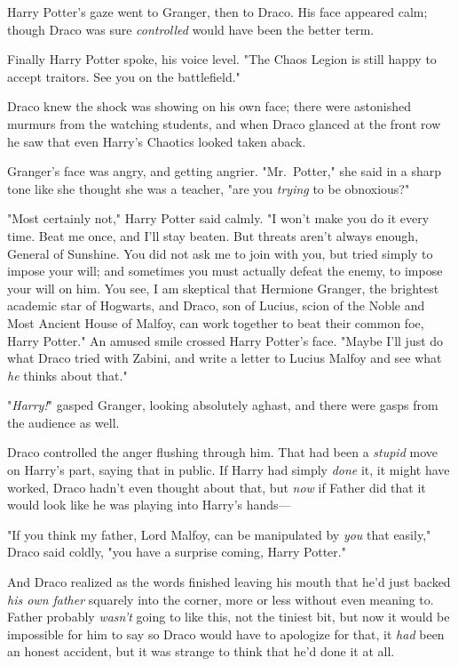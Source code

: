 Harry Potter's gaze went to Granger, then to Draco. His face appeared calm;
though Draco was sure \emph{controlled} would have been the better term.

Finally Harry Potter spoke, his voice level. "The Chaos Legion is still happy
to accept traitors. See you on the battlefield."

Draco knew the shock was showing on his own face; there were astonished murmurs
from the watching students, and when Draco glanced at the front row he saw that
even Harry's Chaotics looked taken aback.

Granger's face was angry, and getting angrier. "Mr.~Potter," she said in a
sharp tone like she thought she was a teacher, "are you \emph{trying} to be
obnoxious?"

"Most certainly not," Harry Potter said calmly. "I won't make you do it every
time. Beat me once, and I'll stay beaten. But threats aren't always enough,
General of Sunshine. You did not ask me to join with you, but tried simply to
impose your will; and sometimes you must actually defeat the enemy, to impose
your will on him. You see, I am skeptical that Hermione Granger, the brightest
academic star of Hogwarts, and Draco, son of Lucius, scion of the Noble and
Most Ancient House of Malfoy, can work together to beat their common foe, Harry
Potter." An amused smile crossed Harry Potter's face. "Maybe I'll just do what
Draco tried with Zabini, and write a letter to Lucius Malfoy and see what
\emph{he} thinks about that."

"\emph{Harry!}" gasped Granger, looking absolutely aghast, and there were gasps
from the audience as well.

Draco controlled the anger flushing through him. That had been a \emph{stupid}
move on Harry's part, saying that in public. If Harry had simply \emph{done}
it, it might have worked, Draco hadn't even thought about that, but \emph{now}
if Father did that it would look like he was playing into Harry's hands---

"If you think my father, Lord Malfoy, can be manipulated by \emph{you} that
easily," Draco said coldly, "you have a surprise coming, Harry Potter."

And Draco realized as the words finished leaving his mouth that he'd just
backed \emph{his own father} squarely into the corner, more or less without
even meaning to. Father probably \emph{wasn't} going to like this, not the
tiniest bit, but now it would be impossible for him to say so{\el} Draco
would have to apologize for that, it \emph{had} been an honest accident, but it
was strange to think that he'd done it at all.

